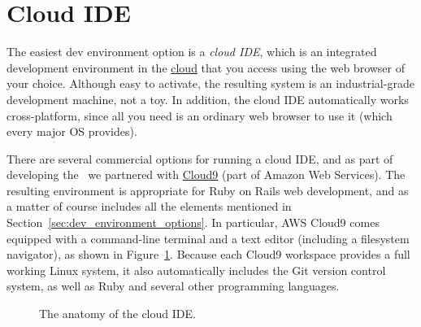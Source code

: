 

\section{Cloud IDE}
\label{sec:cloud_ide}

The easiest dev environment option is a \emph{cloud IDE}, which is an integrated development environment in the \href{https://en.wikipedia.org/wiki/Cloud_computing}{cloud} that you access using the web browser of your choice. Although easy to activate, the resulting system is an industrial-grade development machine, not a toy. In addition, the cloud IDE automatically works cross-platform, since all you need is an ordinary web browser to use it (which every major OS provides).

There are several commercial options for running a cloud IDE, and as part of developing the \rort\ we partnered with \href{https://aws.amazon.com/cloud9/}{Cloud9} (part of Amazon Web Services). The resulting environment is appropriate for Ruby on Rails web development, and as a matter of course includes all the elements mentioned in Section~\ref{sec:dev_environment_options}. In particular, AWS Cloud9 comes equipped with a command-line terminal and a text editor (including a filesystem navigator), as shown in Figure~\ref{fig:ide_anatomy}. Because each Cloud9 workspace provides a full working Linux system, it also automatically includes the Git version control system, as well as Ruby and several other programming languages.

\begin{figure}
\begin{center}
\end{center}
\caption{The anatomy of the cloud IDE.\label{fig:ide_anatomy}}
\end{figure}

